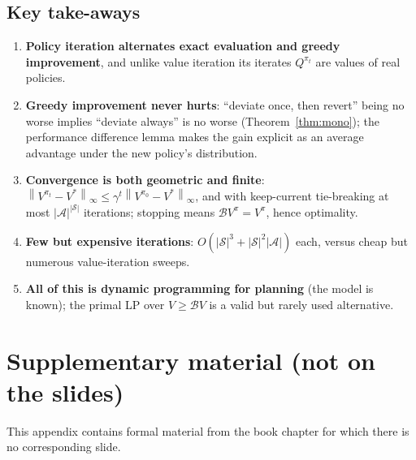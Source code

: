 \documentclass[11pt,a4paper]{article}
\newcommand{\Sset}{\mathcal{S}}
\newcommand{\Aset}{\mathcal{A}}
\newcommand{\B}{\mathcal{B}}
\newcommand{\norm}[1]{\left\lVert #1\right\rVert_\infty}
\theoremstyle{plain}
\theoremstyle{definition}
\theoremstyle{remark}
\begin{document}
\subsection*{Key take-aways}
\begin{enumerate}[itemsep=2pt]
\item \textbf{Policy iteration alternates exact evaluation and greedy improvement}, and unlike value iteration its iterates $Q^{\pi_t}$ are values of real policies.
\item \textbf{Greedy improvement never hurts}: ``deviate once, then revert'' being no worse implies ``deviate always'' is no worse (Theorem~\ref{thm:mono}); the performance difference lemma makes the gain explicit as an average advantage under the new policy's distribution.
\item \textbf{Convergence is both geometric and finite}: $\norm{V^{\pi_t}-V^*}\le\gamma^t\norm{V^{\pi_0}-V^*}$, and with keep-current tie-breaking at most $|\Aset|^{|\Sset|}$ iterations; stopping means $\B V^{\pi}=V^{\pi}$, hence optimality.
\item \textbf{Few but expensive iterations}: $O(|\Sset|^3+|\Sset|^2|\Aset|)$ each, versus cheap but numerous value-iteration sweeps.
\item \textbf{All of this is dynamic programming for planning} (the model is known); the primal LP over $V\ge\B V$ is a valid but rarely used alternative.
\end{enumerate}

\appendix
\section{Supplementary material (not on the slides)}\label{app:box}
This appendix contains formal material from the book chapter for which there is no corresponding slide.
\end{document}
